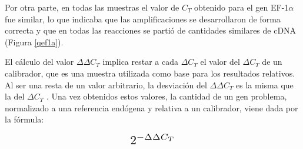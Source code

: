 \documentclass[12pt,letterpaper,oneside]{scrbook}
\begin{document}
Por otra parte, en todas las muestras el valor de \(C_T\) obtenido para
el gen EF-1\(\alpha\) fue similar, lo que indicaba que las
amplificaciones se desarrollaron de forma correcta y que en todas las
reacciones se partió de cantidades similares de cDNA (Figura
\ref{qef1a}).

El cálculo del valor \(\Delta\Delta C_T\) implica restar a cada
\(\Delta C_T\) el valor del \(\Delta C_T\) de un calibrador, que es una
muestra utilizada como base para los resultados relativos. Al ser una
resta de un valor arbitrario, la desviación del \(\Delta\Delta C_T\) es
la misma que la del \(\Delta C_T\) . Una vez obtenidos estos valores, la
cantidad de un gen problema, normalizado a una referencia endógena y
relativa a un calibrador, viene dada por la fórmula:

\begin{displaymath}
\scalebox{1.5}{
$2^{-\Delta\Delta C_T}$
}
\end{displaymath}
\end{document}
